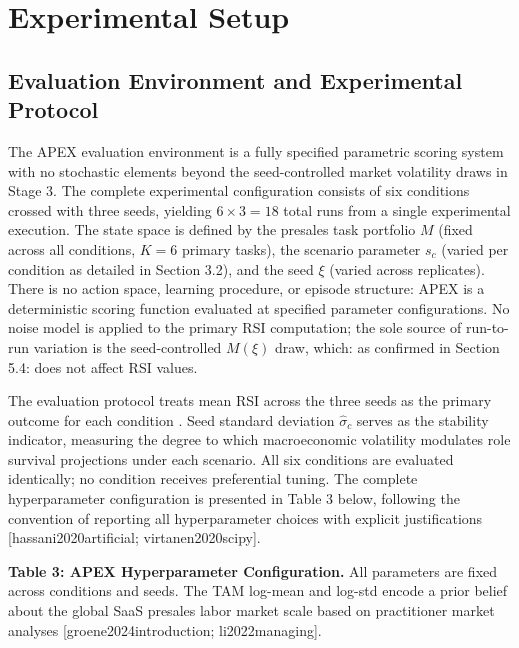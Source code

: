 \documentclass[10pt, conference]{IEEEtran}
\begin{document}
\section{Experimental Setup}

\label{sec:experimental_setup}

\subsection{Evaluation Environment and Experimental Protocol}

\label{sec:evaluation_environment_and_experimental_}

The APEX evaluation environment is a fully specified parametric scoring system with no stochastic elements beyond the seed-controlled market volatility draws in Stage 3. The complete experimental configuration consists of six conditions crossed with three seeds, yielding $6 \times 3 = 18$ total runs from a single experimental execution. The state space is defined by the presales task portfolio $M$ (fixed across all conditions, $K = 6$ primary tasks), the scenario parameter $s_c$ (varied per condition as detailed in Section 3.2), and the seed $\xi$ (varied across replicates). There is no action space, learning procedure, or episode structure: APEX is a deterministic scoring function evaluated at specified parameter configurations. No noise model is applied to the primary RSI computation; the sole source of run-to-run variation is the seed-controlled $M(\xi)$ draw, which: as confirmed in Section 5.4: does not affect RSI values.

The evaluation protocol treats mean RSI across the three seeds as the primary outcome for each condition \cite{wiser2021expert}. Seed standard deviation $\hat{\sigma}_c$ serves as the stability indicator, measuring the degree to which macroeconomic volatility modulates role survival projections under each scenario. All six conditions are evaluated identically; no condition receives preferential tuning. The complete hyperparameter configuration is presented in Table 3 below, following the convention of reporting all hyperparameter choices with explicit justifications [hassani2020artificial; virtanen2020scipy].

\textbf{Table 3: APEX Hyperparameter Configuration.} All parameters are fixed across conditions and seeds. The TAM log-mean and log-std encode a prior belief about the global SaaS presales labor market scale based on practitioner market analyses [groene2024introduction; li2022managing].
\end{document}
